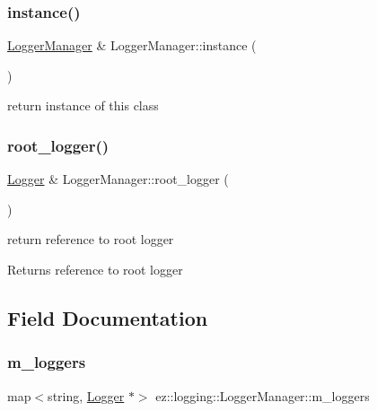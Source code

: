 \subsubsection{\texorpdfstring{instance()}{instance()}}
{\footnotesize\ttfamily \hyperlink{classez_1_1logging_1_1LoggerManager}{Logger\+Manager} \& Logger\+Manager\+::instance (\begin{DoxyParamCaption}{ }\end{DoxyParamCaption})\hspace{0.3cm}{\ttfamily [static]}}

return instance of this class \mbox{\label{classez_1_1logging_1_1LoggerManager_aa5f5fae8e256e6f3dc4269d506723b31}} 
\subsubsection{\texorpdfstring{root\+\_\+logger()}{root\_logger()}}
{\footnotesize\ttfamily \hyperlink{classez_1_1logging_1_1Logger}{Logger} \& Logger\+Manager\+::root\+\_\+logger (\begin{DoxyParamCaption}{ }\end{DoxyParamCaption})}

return reference to root logger \begin{DoxyReturn}{Returns}
reference to root logger 
\end{DoxyReturn}


\subsection{Field Documentation}
\mbox{\label{classez_1_1logging_1_1LoggerManager_a8c68f8c359e7a32438c9da137aa8b9bc}} 
\subsubsection{\texorpdfstring{m\+\_\+loggers}{m\_loggers}}
{\footnotesize\ttfamily map$<$string, \hyperlink{classez_1_1logging_1_1Logger}{Logger} $\ast$$>$ ez\+::logging\+::\+Logger\+Manager\+::m\+\_\+loggers\hspace{0.3cm}{\ttfamily [protected]}}

